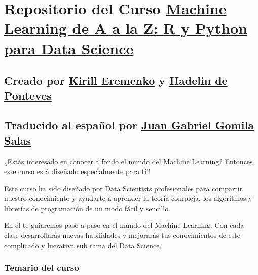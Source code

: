 \documentclass[]{article}
\author{}
\date{\vspace{-2.5em}}
\begin{document}
\hypertarget{repositorio-del-curso-machine-learning-de-a-a-la-z-r-y-python-para-data-science}{%
\section{\texorpdfstring{Repositorio del Curso
\href{https://www.udemy.com/draft/2241862/?couponCode=GITHUB_PROMO_JB}{Machine
Learning de A a la Z: R y Python para Data
Science}}{Repositorio del Curso Machine Learning de A a la Z: R y Python para Data Science}}\label{repositorio-del-curso-machine-learning-de-a-a-la-z-r-y-python-para-data-science}}

\hypertarget{creado-por-kirill-eremenko-y-hadelin-de-ponteves}{%
\subsection{\texorpdfstring{Creado por
\href{https://www.udemy.com/user/kirilleremenko/}{Kirill Eremenko} y
\href{https://www.udemy.com/user/hadelin-de-ponteves/}{Hadelin de
Ponteves}}{Creado por Kirill Eremenko y Hadelin de Ponteves}}\label{creado-por-kirill-eremenko-y-hadelin-de-ponteves}}

\hypertarget{traducido-al-espauxf1ol-por-juan-gabriel-gomila-salas}{%
\subsection{\texorpdfstring{Traducido al español por
\href{https://www.udemy.com/user/juangabriel2}{Juan Gabriel Gomila
Salas}}{Traducido al español por Juan Gabriel Gomila Salas}}\label{traducido-al-espauxf1ol-por-juan-gabriel-gomila-salas}}

¿Estás interesado en conocer a fondo el mundo del Machine Learning?
Entonces este curso está diseñado especialmente para ti!!

Este curso ha sido diseñado por Data Scientists profesionales para
compartir nuestro conocimiento y ayudarte a aprender la teoría compleja,
los algoritmos y librerías de programación de un modo fácil y sencillo.

En él te guiaremos paso a paso en el mundo del Machine Learning. Con
cada clase desarrollarás nuevas habilidades y mejorarás tus
conocimientos de este complicado y lucrativa sub rama del Data Science.

\hypertarget{temario-del-curso}{%
\subsubsection{Temario del curso}\label{temario-del-curso}}
\end{document}
